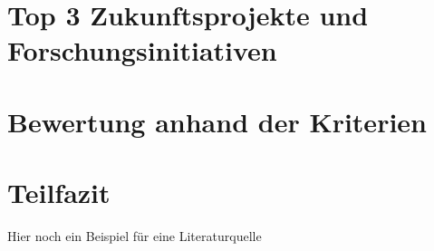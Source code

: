 \section{Top 3 Zukunftsprojekte und Forschungsinitiativen}

\section{Bewertung anhand der Kriterien}

\section{Teilfazit}

Hier noch ein Beispiel für eine Literaturquelle 


\cite{feri_cognitive_finance_institute_quantenzeitalter_2024}

\printbibliography



